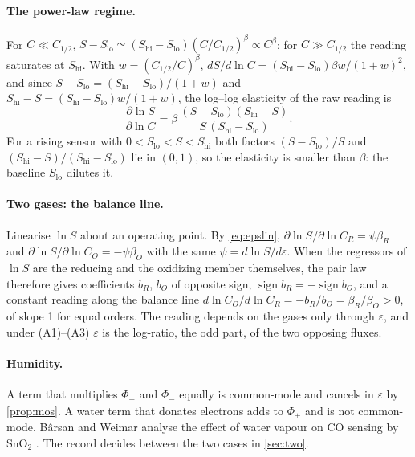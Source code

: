 \documentclass[11pt]{article}
\theoremstyle{definition}\newtheorem{definition}[theorem]{Definition}
\theoremstyle{remark}\newtheorem{remark}[theorem]{Remark}
\begin{document}
\paragraph{The power-law regime.} For $C\ll C_{1/2}$, $S-S_\mathrm{lo}\simeq(S_\mathrm{hi}-S_\mathrm{lo})(C/C_{1/2})^{\beta}\propto C^{\beta}$; for $C\gg C_{1/2}$ the reading saturates at $S_\mathrm{hi}$. With $w=(C_{1/2}/C)^{\beta}$, $dS/d\ln C=(S_\mathrm{hi}-S_\mathrm{lo})\beta w/(1+w)^2$, and since $S-S_\mathrm{lo}=(S_\mathrm{hi}-S_\mathrm{lo})/(1+w)$ and $S_\mathrm{hi}-S=(S_\mathrm{hi}-S_\mathrm{lo})w/(1+w)$, the log--log elasticity of the raw reading is
\begin{equation}\label{eq:elast}
\frac{\partial\ln S}{\partial\ln C}=\beta\,\frac{(S-S_\mathrm{lo})(S_\mathrm{hi}-S)}{S\,(S_\mathrm{hi}-S_\mathrm{lo})}.
\end{equation}
For a rising sensor with $0<S_\mathrm{lo}<S<S_\mathrm{hi}$ both factors $(S-S_\mathrm{lo})/S$ and $(S_\mathrm{hi}-S)/(S_\mathrm{hi}-S_\mathrm{lo})$ lie in $(0,1)$, so the elasticity is smaller than $\beta$: the baseline $S_\mathrm{lo}$ dilutes it.

\paragraph{Two gases: the balance line.} Linearise $\ln S$ about an operating point. By \eqref{eq:epslin}, $\partial\ln S/\partial\ln C_R=\psi\beta_R$ and $\partial\ln S/\partial\ln C_O=-\psi\beta_O$ with the same $\psi=d\ln S/d\varepsilon$. When the regressors of $\ln S$ are the reducing and the oxidizing member themselves, the pair law therefore gives coefficients $b_R$, $b_O$ of opposite sign, $\operatorname{sign}b_R=-\operatorname{sign}b_O$, and a constant reading along the balance line $d\ln C_O/d\ln C_R=-b_R/b_O=\beta_R/\beta_O>0$, of slope 1 for equal orders. The reading depends on the gases only through $\varepsilon$, and under (A1)--(A3) $\varepsilon$ is the log-ratio, the odd part, of the two opposing fluxes.

\paragraph{Humidity.} A term that multiplies $\Phi_+$ and $\Phi_-$ equally is common-mode and cancels in $\varepsilon$ by \cref{prop:mos}. A water term that donates electrons adds to $\Phi_+$ and is not common-mode. B\^arsan and Weimar analyse the effect of water vapour on CO sensing by SnO$_2$ \cite{BarsanWeimar2003}. The record decides between the two cases in \cref{sec:two}.
\end{document}
